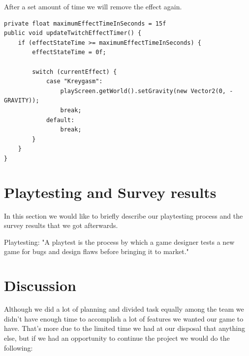 \documentclass[12p]{article}
\begin{document}
After a set amount of time we will remove the effect again.

\begin{verbatim}
private float maximumEffectTimeInSeconds = 15f
public void updateTwitchEffectTimer() {
    if (effectStateTime >= maximumEffectTimeInSeconds) {
        effectStateTime = 0f;

        switch (currentEffect) {
            case "Kreygasm":
                playScreen.getWorld().setGravity(new Vector2(0, - GRAVITY));
                break;
            default:
                break;
        }
    }
}
\end{verbatim}


\newpage
\section{Playtesting and Survey results}

In this section we would like to briefly describe our playtesting process and the survey results that we got afterwards.

Playtesting:
"A playtest is the process by which a game designer tests a new game for bugs and design flaws before bringing it to market." \cite{Playtest}




\newpage
\section{Discussion} \label{Discussion}

Although we did a lot of planning and divided task equally among the team we didn't have enough time to accomplish a lot of features we wanted our game to have. That's more due to the limited time we had at our disposal that anything else, but if we had an opportunity to continue the project we would do the following:
\end{document}
